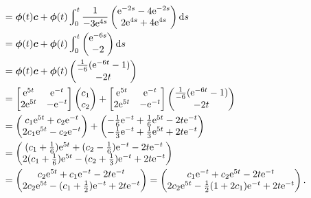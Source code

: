 \documentclass[12pt,UTF8]{ctexart}
\newcommand{\Int}[4]{\varint\nolimits_{#1}^{#2}#3\mathrm d#4}
\newcommand{\me}[0]{\mathrm e}
\begin{document}
\begin{enumerate}
\[\begin{aligned}
&=\bm\phi(t)\bm c+\bm\phi(t)\Int0t{\frac1{-3\me^{4s}}\begin{pmatrix}
\me^{-2s}-4\me^{-2s}\\
2\me^{4s}+4\me^{4s}
\end{pmatrix}}s\\
&=\bm\phi(t)\bm c+\bm\phi(t)\Int0t{\begin{pmatrix}
\me^{-6s}\\
-2
\end{pmatrix}}s\\
&=\bm\phi(t)\bm c+\bm\phi(t)\begin{pmatrix}
\frac1{-6}(\me^{-6t}-1)\\
-2t
\end{pmatrix}\\
&=\begin{bmatrix}
\me^{5t}&\me^{-t}
\\2\me^{5t}&-\me^{-t}
\end{bmatrix}\begin{pmatrix}
c_1\\c_2
\end{pmatrix}+\begin{bmatrix}
\me^{5t}&\me^{-t}
\\2\me^{5t}&-\me^{-t}
\end{bmatrix}\begin{pmatrix}
\frac1{-6}(\me^{-6t}-1)\\
-2t
\end{pmatrix}\\
&=\begin{pmatrix}
c_1\me^{5t}+c_2\me^{-t}\\
2c_1\me^{5t}-c_2\me^{-t}
\end{pmatrix}+\begin{pmatrix}
-\frac16\me^{-t}+\frac16\me^{5t}-2t\me^{-t}\\
-\frac13\me^{-t}+\frac13\me^{5t}+2t\me^{-t}
\end{pmatrix}\\
&=\begin{pmatrix}
(c_1+\frac16)\me^{5t}+(c_2-\frac16)\me^{-t}-2t\me^{-t}\\
2(c_1+\frac16)\me^{5t}-(c_2+\frac13)\me^{-t}+2t\me^{-t}
\end{pmatrix}\\
&=\begin{pmatrix}
c_2\me^{5t}+c_1\me^{-t}-2t\me^{-t}\\
2c_2\me^{5t}-(c_1+\frac12)\me^{-t}+2t\me^{-t}
\end{pmatrix}=\begin{pmatrix}
c_1\me^{-t}+c_2\me^{5t}-2t\me^{-t}\\
2c_2\me^{5t}-\frac12(1+2c_1)\me^{-t}+2t\me^{-t}
\end{pmatrix}.
\end{aligned}\]


\end{enumerate}
\end{document}
